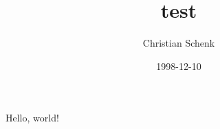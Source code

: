 \documentclass[a4paper,10pt,notitlepage]{article}
\begin{document}
\title{test}
\author{Christian Schenk}
\date{1998-12-10}
Hello, world!
\end{document}
